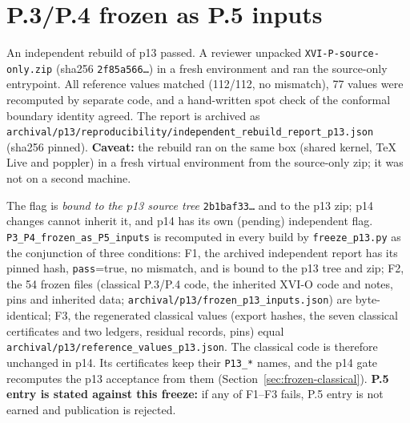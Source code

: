\section{P.3/P.4 frozen as P.5 inputs}\label{sec:p14-freeze}
An independent rebuild of p13 passed. A reviewer unpacked \texttt{XVI-P-source-only.zip} (sha256 \texttt{2f85a566\ldots})
in a fresh environment and ran the source-only entrypoint. All reference values matched (112/112, no mismatch), 77
values were recomputed by separate code, and a hand-written spot check of the conformal boundary identity agreed.
The report is archived as \texttt{archival/p13/reproducibility/independent\_rebuild\_report\_p13.json} (sha256 pinned).
\textbf{Caveat:} the rebuild ran on the same box (shared kernel, TeX Live and poppler) in a fresh virtual environment
from the source-only zip; it was not on a second machine.

The flag is \emph{bound to the p13 source tree} \texttt{2b1baf33\ldots} and to the p13 zip; p14 changes cannot inherit
it, and p14 has its own (pending) independent flag. \texttt{P3\_P4\_frozen\_as\_P5\_inputs} is recomputed in every build
by \texttt{freeze\_p13.py} as the conjunction of three conditions:
F1, the archived independent report has its pinned hash, \texttt{pass}=true, no mismatch, and is bound to the p13 tree and zip;
F2, the 54 frozen files (classical P.3/P.4 code, the inherited XVI-O code and notes, pins and inherited data;
\texttt{archival/p13/frozen\_p13\_inputs.json}) are byte-identical;
F3, the regenerated classical values (export hashes, the seven classical certificates and two ledgers, residual
records, pins) equal \texttt{archival/p13/reference\_values\_p13.json}.
The classical code is therefore unchanged in p14. Its certificates keep their \texttt{P13\_*} names, and the p14 gate
recomputes the p13 acceptance from them (Section~\ref{sec:frozen-classical}). \textbf{P.5 entry is stated against this
freeze:} if any of F1--F3 fails, P.5 entry is not earned and publication is rejected.

